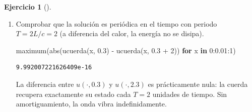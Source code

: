 \documentclass[
  spanish,
  a4paper,
]{scrreport}
\newenvironment{Shaded}{\begin{snugshade}}{\end{snugshade}}
\newcommand{\ControlFlowTok}[1]{\textcolor[rgb]{0.00,0.23,0.31}{\textbf{#1}}}
\newcommand{\FloatTok}[1]{\textcolor[rgb]{0.68,0.00,0.00}{#1}}
\newcommand{\FunctionTok}[1]{\textcolor[rgb]{0.28,0.35,0.67}{#1}}
\newcommand{\KeywordTok}[1]{\textcolor[rgb]{0.00,0.23,0.31}{\textbf{#1}}}
\newcommand{\NormalTok}[1]{\textcolor[rgb]{0.00,0.23,0.31}{#1}}
\newcommand{\OperatorTok}[1]{\textcolor[rgb]{0.37,0.37,0.37}{#1}}
\theoremstyle{definition}
\newtheorem{exercise}{Ejercicio}[chapter]
\theoremstyle{remark}
\begin{document}
\begin{exercise}[]
\begin{enumerate}
\begin{tcolorbox}
  \end{tcolorbox}
\item
  Comprobar que la solución es periódica en el tiempo con periodo
  \(T = 2L/c = 2\) (a diferencia del calor, la energía no se disipa).

  \begin{tcolorbox}[enhanced jigsaw, arc=.35mm, bottomrule=.15mm, bottomtitle=1mm, breakable, colback=white, colbacktitle=quarto-callout-tip-color!10!white, colframe=quarto-callout-tip-color-frame, coltitle=black, left=2mm, leftrule=.75mm, opacityback=0, opacitybacktitle=0.6, rightrule=.15mm, title=\textcolor{quarto-callout-tip-color}{\faLightbulb}\hspace{0.5em}{Solución}, titlerule=0mm, toprule=.15mm, toptitle=1mm]

\begin{Shaded}
\begin{Highlighting}[]
\FunctionTok{maximum}\NormalTok{(}\FunctionTok{abs}\NormalTok{(}\FunctionTok{ucuerda}\NormalTok{(x, }\FloatTok{0.3}\NormalTok{) }\OperatorTok{{-}} \FunctionTok{ucuerda}\NormalTok{(x, }\FloatTok{0.3} \OperatorTok{+} \FloatTok{2}\NormalTok{)) }\ControlFlowTok{for}\NormalTok{ x }\KeywordTok{in} \FloatTok{0}\OperatorTok{:}\FloatTok{0.01}\OperatorTok{:}\FloatTok{1}\NormalTok{)}
\end{Highlighting}
\end{Shaded}

\begin{verbatim}
9.992007221626409e-16
\end{verbatim}

  La diferencia entre \(u(\cdot, 0.3)\) y \(u(\cdot, 2.3)\) es
  prácticamente nula: la cuerda recupera exactamente su estado cada
  \(T = 2\) unidades de tiempo. Sin amortiguamiento, la onda vibra
  indefinidamente.

  \end{tcolorbox}
\end{enumerate}

\end{exercise}
\end{document}

